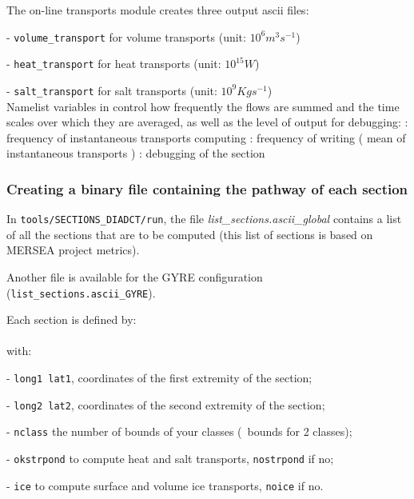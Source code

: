 \documentclass[../main/NEMO_manual]{subfiles}
\begin{document}
The on-line transports module creates three output ascii files:

- \texttt{volume\_transport} for volume transports (unit: $10^{6} m^{3} s^{-1}$)

- \texttt{heat\_transport}   for   heat transports (unit: $10^{15} W$)

- \texttt{salt\_transport}   for   salt transports (unit: $10^{9}Kg s^{-1}$) \\

Namelist variables in  control how frequently the flows are summed and the time scales over which
they are averaged, as well as the level of output for debugging:
   : frequency of instantaneous transports computing
: frequency of writing ( mean of instantaneous transports )
 : debugging of the section

\subsubsection{Creating a binary file containing the pathway of each section}

In \texttt{tools/SECTIONS\_DIADCT/run},
the file \textit{ {list\_sections.ascii\_global}} contains a list of all the sections that are to be computed
(this list of sections is based on MERSEA project metrics).

Another file is available for the GYRE configuration (\texttt{ {list\_sections.ascii\_GYRE}}).

Each section is defined by: \\
 \\
with:

 - \texttt{long1 lat1}, coordinates of the  first extremity of the section;

 - \texttt{long2 lat2}, coordinates of the second extremity of the section;

 - \texttt{nclass}    the number of bounds of your classes (\eg\ bounds for 2 classes);

 - \texttt{okstrpond} to compute    heat and       salt transports, \texttt{nostrpond} if no;

 - \texttt{ice}       to compute surface and volume ice transports, \texttt{noice}     if no. \\
\end{document}
